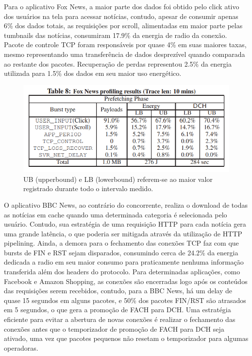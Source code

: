 \documentclass{article}
\begin{document}
Para o aplicativo Fox News, a maior parte dos dados foi obtido pelo click ativo dos usuários na tela para acessar
notícias, contudo, apesar de consumir apenas 6\% dos dados totais, as requisições por scroll, alimentadas em maior parte
pelas tumbnails das notícias, consumiram 17.9\% da energia de radio da conexão. Pacote de controle TCP foram responsáveis
por quase 4\% em suas maiores taxas, mesmo representando uma transferência de dados desprezível quando comparada ao
restante dos pacotes. Recuperação de perdas representou 2.5\% da energia utilizada para 1.5\% dos dados em seu maior
uso energético.

\begin{figure}[!h]
\includegraphics[width=\textwidth]{tabela-fox-news}
\caption{UB (upperbound) e LB (lowerbound) referem-se ao maior valor registrado durante todo o intervalo medido.}
\centering
\end{figure}


O aplicativo BBC News, ao contrário do concorrente, realiza o download de todas as notícias em cache quando uma
determinada categoria é selecionada pelo usuário. Contudo, sua estratégia de uma requisição HTTP para cada notícia gera
uma grande latência, o que poderia ser mitigada através da utilização de HTTP pipelining. Ainda, a demora para o
fechamento das conexões TCP faz com que bursts de FIN e RST sejam disparados, consumindo cerca de 24.2\% da energia
dedicada a radio em seu maior consumo para praticamente nenhuma informação transferida além dos headers do protocolo.
Para determinadas aplicações, como Facebook e Amazon Shopping, as conexões são encerradas logo após os conteúdos das
requisições serem recebidos, contudo, para a BBC News, há um delay de quase 15 segundos em alguns pacotes, e 50\% dos
pacotes FIN/RST são atrasados em 5 segundos, o que gera a promoção de FACH para DCH. Uma estratégia eficiente para
evitar a abertura de novas conexões é realizar o fechamento das conexões antes que o temporizador de promoção de FACH
para DCH seja ativado, uma vez que pacotes pequenos não resetam o temporizador para algumas operadoras.
\end{document}
